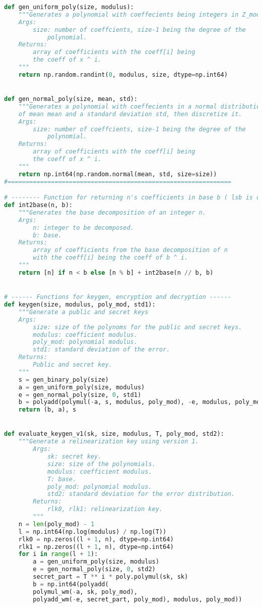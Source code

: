 \documentclass{article}
\begin{document}
\begin{lstlisting}[language=Python]
def gen_uniform_poly(size, modulus):
    """Generates a polynomial with coeffecients being integers in Z_modulus
    Args:
        size: number of coeffcients, size-1 being the degree of the
            polynomial.
    Returns:
        array of coefficients with the coeff[i] being
        the coeff of x ^ i.
    """
    return np.random.randint(0, modulus, size, dtype=np.int64)


def gen_normal_poly(size, mean, std):
    """Generates a polynomial with coeffecients in a normal distribution
    of mean mean and a standard deviation std, then discretize it.
    Args:
        size: number of coeffcients, size-1 being the degree of the
            polynomial.
    Returns:
        array of coefficients with the coeff[i] being
        the coeff of x ^ i.
    """
    return np.int64(np.random.normal(mean, std, size=size))
#==============================================================

# -------- Function for returning n's coefficients in base b ( lsb is on the left) ---
def int2base(n, b):
    """Generates the base decomposition of an integer n.
    Args:
        n: integer to be decomposed.
        b: base.
    Returns:
        array of coefficients from the base decomposition of n
        with the coeff[i] being the coeff of b ^ i.
    """
    return [n] if n < b else [n % b] + int2base(n // b, b)


# ------ Functions for keygen, encryption and decryption ------
def keygen(size, modulus, poly_mod, std1):
    """Generate a public and secret keys
    Args:
        size: size of the polynoms for the public and secret keys.
        modulus: coefficient modulus.
        poly_mod: polynomial modulus.
        std1: standard deviation of the error.
    Returns:
        Public and secret key.
    """
    s = gen_binary_poly(size)
    a = gen_uniform_poly(size, modulus)
    e = gen_normal_poly(size, 0, std1)
    b = polyadd(polymul(-a, s, modulus, poly_mod), -e, modulus, poly_mod)
    return (b, a), s


def evaluate_keygen_v1(sk, size, modulus, T, poly_mod, std2):
    """Generate a relinearization key using version 1.
        Args:
            sk: secret key.
            size: size of the polynomials.
            modulus: coefficient modulus.
            T: base.
            poly_mod: polynomial modulus.
            std2: standard deviation for the error distribution.
        Returns:
            rlk0, rlk1: relinearization key.
        """
    n = len(poly_mod) - 1
    l = np.int64(np.log(modulus) / np.log(T))
    rlk0 = np.zeros((l + 1, n), dtype=np.int64)
    rlk1 = np.zeros((l + 1, n), dtype=np.int64)
    for i in range(l + 1):
        a = gen_uniform_poly(size, modulus)
        e = gen_normal_poly(size, 0, std2)
        secret_part = T ** i * poly.polymul(sk, sk)
        b = np.int64(polyadd(
        polymul_wm(-a, sk, poly_mod),
        polyadd_wm(-e, secret_part, poly_mod), modulus, poly_mod))


\end{lstlisting}
\end{document}
